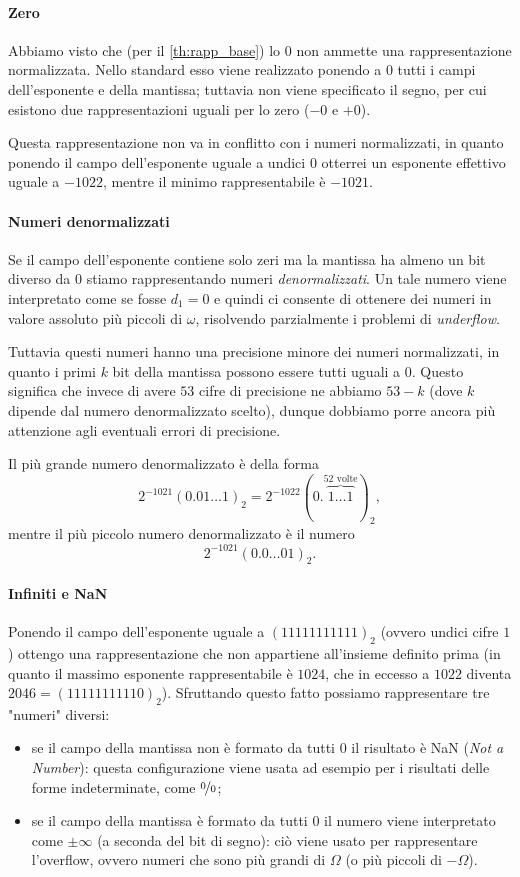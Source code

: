 \paragraph{Zero} Abbiamo visto che (per il \autoref{th:rapp_base}) lo $0$ non ammette una rappresentazione normalizzata. Nello standard \IEEE esso viene realizzato ponendo a $0$ tutti i campi dell'esponente e della mantissa; tuttavia non viene specificato il segno, per cui esistono due rappresentazioni uguali per lo zero ($-0$ e $+0$). 

Questa rappresentazione non va in conflitto con i numeri normalizzati, in quanto ponendo il campo dell'esponente uguale a undici $0$ otterrei un esponente effettivo uguale a $-1022$, mentre il minimo rappresentabile è $-1021$. 

\paragraph{Numeri denormalizzati} Se il campo dell'esponente contiene solo zeri ma la mantissa ha almeno un bit diverso da $0$ stiamo rappresentando numeri \emph{denormalizzati}. Un tale numero viene interpretato come se fosse $d_1 = 0$ e quindi ci consente di ottenere dei numeri in valore assoluto più piccoli di $\omega$, risolvendo parzialmente i problemi di \emph{underflow}. 

Tuttavia questi numeri hanno una precisione minore dei numeri normalizzati, in quanto i primi $k$ bit della mantissa possono essere tutti uguali a $0$. Questo significa che invece di avere $53$ cifre di precisione ne abbiamo $53 - k$ (dove $k$ dipende dal numero denormalizzato scelto), dunque dobbiamo porre ancora più attenzione agli eventuali errori di precisione.

Il più grande numero denormalizzato è della forma \[
    2^{-1021} (0.01\dots1)_2 = 2^{-1022} (0.\!\!\overbrace{1\dots1}^{52\text{ volte}})_2,
\] mentre il più piccolo numero denormalizzato è il numero \[
    2^{-1021} (0.0\dots01)_2.
\]

\paragraph{Infiniti e NaN} Ponendo il campo dell'esponente uguale a $(11111111111)_2$ (ovvero undici cifre $1$) ottengo una rappresentazione che non appartiene all'insieme definito prima (in quanto il massimo esponente rappresentabile è $1024$, che in eccesso a $1022$ diventa $2046 = (11111111110)_2$). Sfruttando questo fatto possiamo rappresentare tre "numeri" diversi:
\begin{itemize}
    \item se il campo della mantissa non è formato da tutti $0$ il risultato è NaN (\emph{Not a Number}): questa configurazione viene usata ad esempio per i risultati delle forme indeterminate, come $\nicefrac00$;
    \item se il campo della mantissa è formato da tutti $0$ il numero viene interpretato come $\pm\infty$ (a seconda del bit di segno): ciò viene usato per rappresentare l'overflow, ovvero numeri che sono più grandi di $\Omega$ (o più piccoli di $-\Omega$). 
\end{itemize}